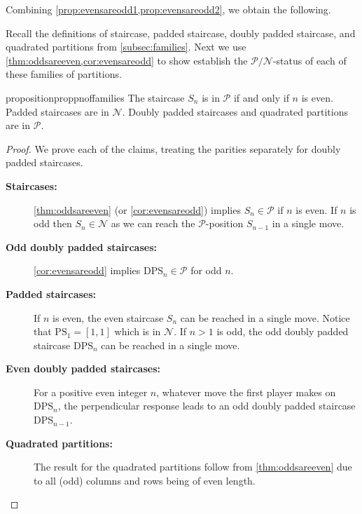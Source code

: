 \documentclass[pdflatex,sn-mathphys-num]{sn-jnl}%
\theoremstyle{thmstyleone}%
\theoremstyle{thmstyletwo}%
\theoremstyle{thmstylethree}%
\newcommand{\p}{\mathcal P}
\newcommand{\n}{\mathcal N}
\newcommand{\dps}{\mathrm{DPS}}
\newcommand{\ps}{\mathrm{PS}}
\newcommand{\s}{S}
\begin{document}
Combining \cref{prop:evensareodd1,prop:evensareodd2}, we obtain the following. 
\corevensareodd*


Recall the definitions of staircase, padded staircase, doubly padded staircase, and quadrated partitions from \cref{subsec:families}. Next we use \cref{thm:oddsareeven,cor:evensareodd} to show establish the $\p/\n$-status of each of these families of partitions.

\begin{restatable}{proposition}{proppnoffamilies} \label{prop:pn-of-families}   
    The staircase $\s_n$ is in $\p$ if and only if $n$ is even.
    Padded staircases are in $\n$.
    Doubly padded staircases and quadrated partitions are in $\p$.
\end{restatable}

\begin{proof}
We prove each of the claims, treating the parities separately for doubly padded staircases.
\begin{description}
    \item[\textbf{Staircases:}]
    \cref{thm:oddsareeven} (or \cref{cor:evensareodd}) implies $\s_n \in \p$ if $n$ is even. If $n$ is odd then $\s_n \in \n$ as we can reach the $\p$-position $\s_{n-1}$ in a single move.
    
    \item[\textbf{Odd doubly padded staircases:}] \cref{cor:evensareodd} implies $\dps_n \in \p$ for odd $n$. 
    
    \item[\textbf{Padded staircases:}] If $n$ is even, the even staircase $S_n$ can be reached in a single move. Notice that $\ps_1 = [1,1]$ which is in $\n$. If $n > 1$ is odd, the odd doubly padded staircase $\dps_n$ can be reached in a single move. 

    \item[\textbf{Even doubly padded staircases:}] 
    For a positive even integer $n$, whatever move the first player makes on $\dps_{n}$, the perpendicular response leads to an odd doubly padded staircase $\dps_{n-1}$.

\item[\textbf{Quadrated partitions:}] 
The result for the quadrated partitions follow from \cref{thm:oddsareeven} due to all (odd) columns and rows being of even length.
\qedhere
\end{description}
\end{proof}
\end{document}
